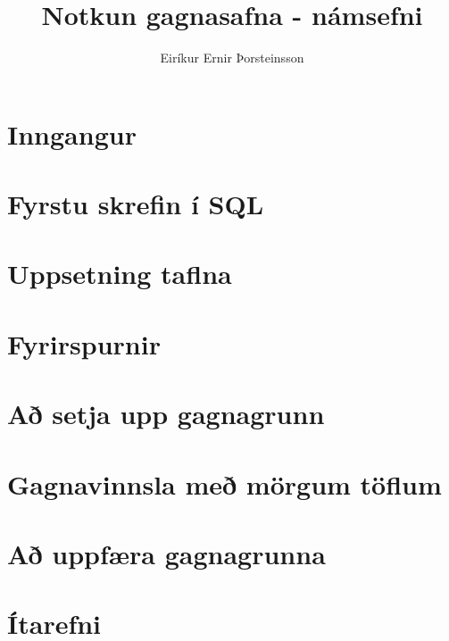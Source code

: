 \documentclass[nohyper,notoc,justified]{tufte-book}
\author{Eiríkur Ernir Þorsteinsson}
\title{Notkun gagnasafna - námsefni}
\date{}
\begin{document}
\setcounter{tocdepth}{2}
\setcounter{secnumdepth}{0}

\maketitle

\tableofcontents

\newpage

\chapter{Inngangur}


\chapter{Fyrstu skrefin í SQL}
\label{kafli:fyrstuskrefin}


\chapter{Uppsetning taflna}
\label{kafli:uppsetningtaflna}


\chapter{Fyrirspurnir}
\label{kafli:select}


\chapter{Að setja upp gagnagrunn}
\label{kafli:uppsetninggagnagrunns}


\chapter{Gagnavinnsla með mörgum töflum}
\label{kafli:gagnavinnslamargartoflur}


\chapter{Að uppfæra gagnagrunna}
\label{kafli:uppfaera}


\chapter{Ítarefni}
\label{kafli:itarefni}

\end{document}
